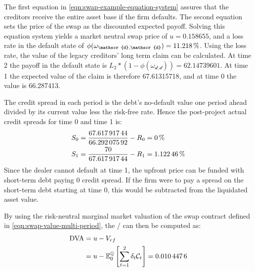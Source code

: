 \documentclass[main.tex]{subfiles}
\begin{document}
            The first equation in \cref{eqn:swap-example-equation-system} assures that the creditors receive the entire asset base if the firm defaults.
            The second equation sets the price of the swap as the discounted expected payoff.
            Solving this equation system yields a market neutral swap price of $u=\num{0.158655}$,
            and a loss rate in the default state of 
            $\phi(\omega_{\mathscr{d},\mathscr{d}})=\pct{0.112180}$.
            Using the loss rate, the value of the legacy creditors' long term claim can be calculated.
            At time 2 the payoff in the default state is 
            $L_{2}*(1-\phi(\omega_{\mathscr{d},\mathscr{d}})) = \num{62.14739601}$.
            At time 1 the expected value of the claim is therefore \num{67.61315718},
            and at time 0 the value is \num{66.287413}.

            The credit spread in each period is the debt's no-default value one period ahead
            divided by its current value less the risk-free rate.
            Hence the post-project actual credit spreads for time 0 and time 1 is:
            \begin{align}
                S_{0} 
                &=
                \frac{
                    \num{67.61791744}
                }{
                    \num{66.29207592}
                }
                -
                R_{0}
                =
                \pct{0}
                \\
                S_{1} 
                &= 
                \frac{
                    \num{70}
                }{
                    \num{67.61791744}
                } 
                -
                R_{1}
                =
                \pct{0.0112246}
            \end{align}
            Since the dealer cannot default at time 1,
            the upfront price can be funded with short-term debt paying 0 credit spread.
            If the firm were to pay a spread on the short-term debt starting at time 0,
            this would be subtracted from the liquidated asset value. 

            By using the risk-neutral marginal market valuation of the swap contract
            defined in \cref{eqn:swap-value-multi-period},
            the \DVA/ can then be computed as:
            \begin{align}
                \DVA/ &= u - V_{rf}
                \nonumber
                \\
                &= u - \mathbb{E}_{0}^{\rnmeasure}\left[\sum_{t=1}^{2}\delta_t \mathcal{C}_t\right]
                = \num{0.0104476}
            \end{align}
\end{document}

